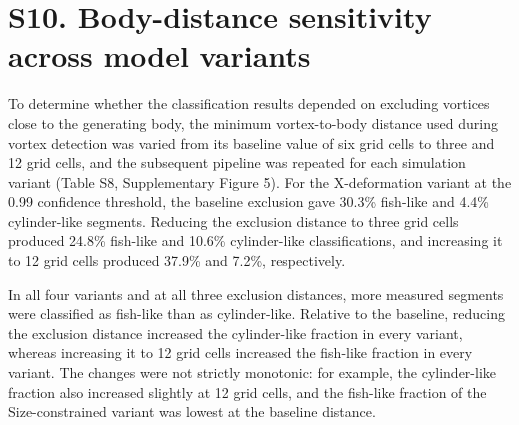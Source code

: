 \documentclass[11pt,a4paper]{article}
\begin{document}
\clearpage

\section*{S10. Body-distance sensitivity across model variants}

To determine whether the classification results depended on excluding vortices close to the generating body, the minimum vortex-to-body distance used during vortex detection was varied from its baseline value of six grid cells to three and 12 grid cells, and the subsequent pipeline was repeated for each simulation variant (Table S8, Supplementary Figure 5). For the X-deformation variant at the 0.99 confidence threshold, the baseline exclusion gave 30.3\% fish-like and 4.4\% cylinder-like segments. Reducing the exclusion distance to three grid cells produced 24.8\% fish-like and 10.6\% cylinder-like classifications, and increasing it to 12 grid cells produced 37.9\% and 7.2\%, respectively.

In all four variants and at all three exclusion distances, more measured segments were classified as fish-like than as cylinder-like. Relative to the baseline, reducing the exclusion distance increased the cylinder-like fraction in every variant, whereas increasing it to 12 grid cells increased the fish-like fraction in every variant. The changes were not strictly monotonic: for example, the cylinder-like fraction also increased slightly at 12 grid cells, and the fish-like fraction of the Size-constrained variant was lowest at the baseline distance.
\end{document}
